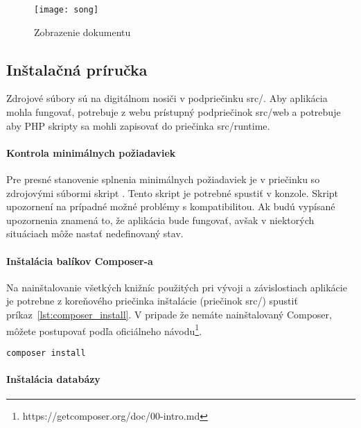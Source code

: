 \begin{figure}
    \begin{center}
        \texttt{[image: song]}
        \caption{Zobrazenie dokumentu}
        \label{fig:song}
    \end{center}
\end{figure}

\newpage

\subsection{Inštalačná príručka}\label{install_guide}

Zdrojové súbory sú na digitálnom nosiči v podpriečinku src/.
Aby aplikácia mohla fungovať, potrebuje z webu prístupný podpriečinok src/web a
potrebuje aby PHP skripty sa mohli zapisovať do priečinka src/runtime.

\paragraph{Kontrola minimálnych požiadaviek}

Pre presné stanovenie splnenia minimálnych požiadaviek je v 
priečinku so zdrojovými súbormi skript . Tento skript
je potrebné spustiť v konzole. Skript upozornení na prípadné možné 
problémy s kompatibilitou. Ak budú vypísané upozornenia znamená to, že aplikácia bude
fungovať, avšak v niektorých situáciach môže nastať nedefinovaný stav.

\paragraph{Inštalácia balíkov Composer-a}

Na nainštalovanie všetkých knižníc použitých pri vývoji a závislostiach aplikácie
je potrebne z koreňového priečinka inštalácie (priečinok src/) spustiť
príkaz \ref{lst:composer_install}. V pripade že nemáte nainštalovaný Composer,
môžete postupovať podľa oficiálneho návodu\footnote{https://getcomposer.org/doc/00-intro.md}.

\begin{lstlisting}[label=lst:composer_install, caption=Inštalácia balíkov Composer-a]
composer install
\end{lstlisting}

\paragraph{Inštalácia databázy}

